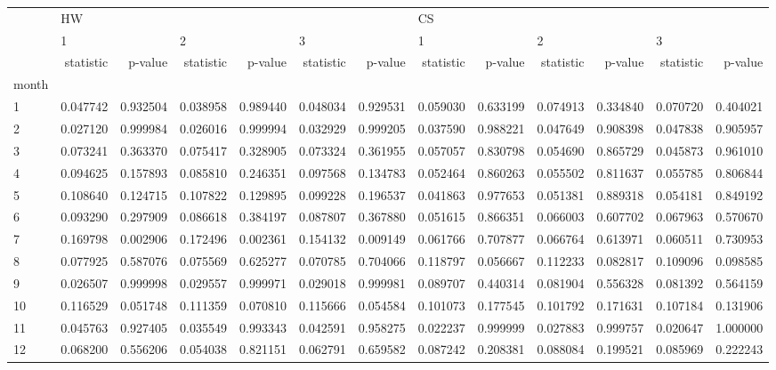 \begin{tabular}{lrrrrrrrrrrrr}
\toprule
{} & \multicolumn{6}{l}{HW} & \multicolumn{6}{l}{CS} \\
{} & \multicolumn{2}{l}{1} & \multicolumn{2}{l}{2} & \multicolumn{2}{l}{3} & \multicolumn{2}{l}{1} & \multicolumn{2}{l}{2} & \multicolumn{2}{l}{3} \\
{} & statistic &   p-value & statistic &   p-value & statistic &   p-value & statistic &   p-value & statistic &   p-value & statistic &   p-value \\
month &           &           &           &           &           &           &           &           &           &           &           &           \\
\midrule
1     &  0.047742 &  0.932504 &  0.038958 &  0.989440 &  0.048034 &  0.929531 &  0.059030 &  0.633199 &  0.074913 &  0.334840 &  0.070720 &  0.404021 \\
2     &  0.027120 &  0.999984 &  0.026016 &  0.999994 &  0.032929 &  0.999205 &  0.037590 &  0.988221 &  0.047649 &  0.908398 &  0.047838 &  0.905957 \\
3     &  0.073241 &  0.363370 &  0.075417 &  0.328905 &  0.073324 &  0.361955 &  0.057057 &  0.830798 &  0.054690 &  0.865729 &  0.045873 &  0.961010 \\
4     &  0.094625 &  0.157893 &  0.085810 &  0.246351 &  0.097568 &  0.134783 &  0.052464 &  0.860263 &  0.055502 &  0.811637 &  0.055785 &  0.806844 \\
5     &  0.108640 &  0.124715 &  0.107822 &  0.129895 &  0.099228 &  0.196537 &  0.041863 &  0.977653 &  0.051381 &  0.889318 &  0.054181 &  0.849192 \\
6     &  0.093290 &  0.297909 &  0.086618 &  0.384197 &  0.087807 &  0.367880 &  0.051615 &  0.866351 &  0.066003 &  0.607702 &  0.067963 &  0.570670 \\
7     &  0.169798 &  0.002906 &  0.172496 &  0.002361 &  0.154132 &  0.009149 &  0.061766 &  0.707877 &  0.066764 &  0.613971 &  0.060511 &  0.730953 \\
8     &  0.077925 &  0.587076 &  0.075569 &  0.625277 &  0.070785 &  0.704066 &  0.118797 &  0.056667 &  0.112233 &  0.082817 &  0.109096 &  0.098585 \\
9     &  0.026507 &  0.999998 &  0.029557 &  0.999971 &  0.029018 &  0.999981 &  0.089707 &  0.440314 &  0.081904 &  0.556328 &  0.081392 &  0.564159 \\
10    &  0.116529 &  0.051748 &  0.111359 &  0.070810 &  0.115666 &  0.054584 &  0.101073 &  0.177545 &  0.101792 &  0.171631 &  0.107184 &  0.131906 \\
11    &  0.045763 &  0.927405 &  0.035549 &  0.993343 &  0.042591 &  0.958275 &  0.022237 &  0.999999 &  0.027883 &  0.999757 &  0.020647 &  1.000000 \\
12    &  0.068200 &  0.556206 &  0.054038 &  0.821151 &  0.062791 &  0.659582 &  0.087242 &  0.208381 &  0.088084 &  0.199521 &  0.085969 &  0.222243 \\
\bottomrule
\end{tabular}

